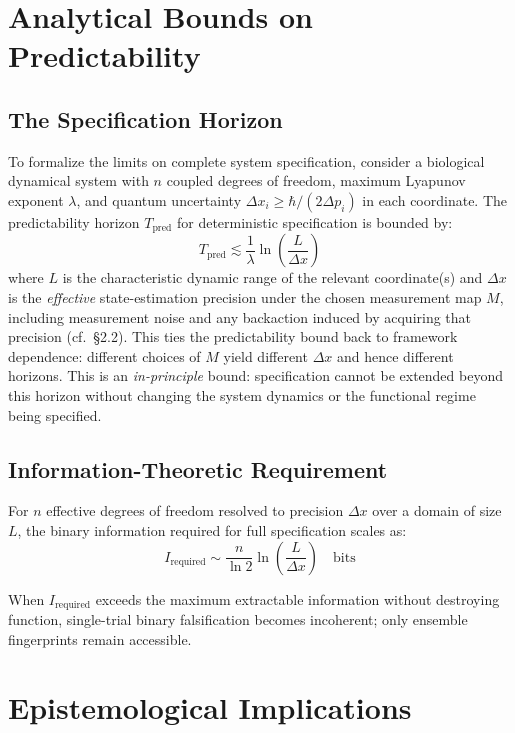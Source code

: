 \documentclass[12pt]{article}
\begin{document}
\section{Analytical Bounds on Predictability}
\label{sec:analytical_bounds}

\subsection{The Specification Horizon}

To formalize the limits on complete system specification, consider a biological dynamical system with $n$ coupled degrees of freedom, maximum Lyapunov exponent $\lambda$, and quantum uncertainty $\Delta x_i \geq \hbar/(2\Delta p_i)$ in each coordinate. The predictability horizon $T_{\text{pred}}$ for deterministic specification is bounded by:
\begin{equation}
T_{\text{pred}} \lesssim \frac{1}{\lambda} \ln\left(\frac{L}{\Delta x}\right)
\end{equation}
where $L$ is the characteristic dynamic range of the relevant coordinate(s) and $\Delta x$ is the \emph{effective} state-estimation precision under the chosen measurement map $M$, including measurement noise and any backaction induced by acquiring that precision (cf.\ \S2.2). This ties the predictability bound back to framework dependence: different choices of $M$ yield different $\Delta x$ and hence different horizons. This is an \textit{in-principle} bound: specification cannot be extended beyond this horizon without changing the system dynamics or the functional regime being specified.

\subsection{Information-Theoretic Requirement}

For $n$ effective degrees of freedom resolved to precision $\Delta x$ over a domain of size $L$, the binary information required for full specification scales as:
\begin{equation}
I_{\text{required}} \sim \frac{n}{\ln 2} \ln\left(\frac{L}{\Delta x}\right) \quad \text{bits}
\end{equation}

When $I_{\text{required}}$ exceeds the maximum extractable information without destroying function, single-trial binary falsification becomes incoherent; only ensemble fingerprints remain accessible.

\section{Epistemological Implications}
\end{document}
